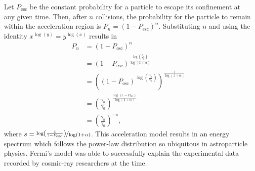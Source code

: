 Let $P_{\text{esc}}$ be the constant probability for a particle to escape its confinement at any given time.
Then,  after $n$ collisions, the probability for the particle to remain within the acceleration region is  $P_n = (1 - P_{\text{esc}})^n$.
Substituting $n$ and using the identity $x^{\log(y)} = y^{\log(x)} $ results in
\begin{align*}
  P_n &= (1 - P_{\text{esc}})^n \\
      &= (1 - P_{\text{esc}})^{\frac{\log\left(\frac{\gamma_n}{\gamma_0}\right)}{\log(1 + \alpha)}} \\
      &= \left((1 - P_{\text{esc}})^{\log\left(\frac{\gamma_n}{\gamma_0}\right)}\right)^{\frac{1}{\log(1 + \alpha)}}\\
      &= \left(\frac{\gamma_n}{\gamma_0}\right)^{\frac{\log(1 - P_{\text{esc}})}{\log(1 + \alpha)}}\\
      &= \left(\frac{\gamma_n}{\gamma_0}\right)^{-s},
\end{align*}
where $s = \nicefrac{\log\left(\frac{1}{1 - P_{\text{esc}}}\right)}{\log(1 + \alpha)}$.
This acceleration model results in an energy spectrum which follows the power-law distribution
so ubiquitous in astroparticle physics. Fermi's model was able to successfully explain the experimental data recorded 
by cosmic-ray researchers at the time.

